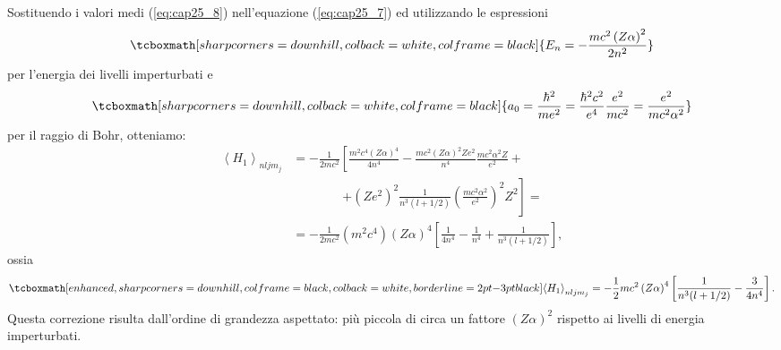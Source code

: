 Sostituendo i valori medi (\ref{eq:cap25_8}) nell'equazione (\ref{eq:cap25_7}) ed utilizzando le espressioni
	\begin{equation} 
		\tcboxmath[sharp corners=downhill, colback=white, colframe=black]{
			E_n=-\frac{mc^2 \left(Z\alpha\right)^2}{2n^2} 
			}
\end{equation}
per l'energia dei livelli imperturbati e 
	\begin{equation} 
		\tcboxmath[sharp corners=downhill, colback=white, colframe=black]{
			a_0=\frac{\hbar^2}{me^2}=\frac{\hbar^2c^2}{e^4}\frac{e^2}{mc^2}=\frac{e^2}{mc^2\alpha^2}
			}
	\end{equation}
per il raggio di Bohr, otteniamo:
	\begin{align} 
		\left\langle H_1 \right\rangle _{nljm_j} & = -\frac{1}{2mc^2} \left[ \frac{m^2c^4 \left( Z \alpha \right)^4}{4n^4}-\frac{mc^2 \left( Z \alpha \right)^2 Z e^2}{n^4} \frac{mc^2\alpha^2 Z}{e^2}+ \right. \nonumber \\
		& \qquad \qquad   \left. + \left( Z e^2 \right)^2 \frac{1}{n^3(l+1/2)} \left(\frac{mc^2\alpha^2}{e^2} \right)^2 Z^2 \right] = \nonumber  \\
		& =  -\frac{1}{2mc^2} \left( m^2c^4 \right) \left( Z \alpha\right)^4 \left[ \frac{1}{4n^4}-\frac{1}{n^4}+\frac{1}{n^3(l+1/2)}  \right] ,
	\end{align}
ossia
	\begin{equation}
	\label{eq:cap25_9}
		\tcboxmath[enhanced, sharp corners=downhill, colframe=black, colback=white, borderline={2pt}{-3pt}{black}]{	
			\left< H_1 \right>_{nljm_j} = -\frac{1}{2}mc^2 \left( Z \alpha \right)^4 \left[ \frac{1}{n^3(l+1/2)}-\frac{3}{4n^4}\right]  .
			}
	\end{equation}
Questa correzione risulta dall'ordine di grandezza aspettato: più piccola di circa un fattore $\left(Z \alpha \right)^2$ rispetto ai livelli di energia imperturbati. \\

